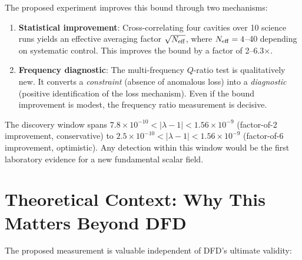 \documentclass[11pt]{article}
\newcommand{\lbone}{|\lambda - 1|}
\newcommand{\ee}[1]{\times 10^{#1}}
\begin{document}
The proposed experiment improves this bound through two mechanisms:
\begin{enumerate}[nosep]
\item \textbf{Statistical improvement}: Cross-correlating four cavities
  over 10 science runs yields an effective averaging factor
  $\sqrt{N_{\rm eff}}$, where $N_{\rm eff} = 4$--40 depending on
  systematic control. This improves the bound by a factor of 2--6.3$\times$.
\item \textbf{Frequency diagnostic}: The multi-frequency $Q$-ratio test
  is qualitatively new. It converts a \textit{constraint} (absence of
  anomalous loss) into a \textit{diagnostic} (positive identification of
  the loss mechanism). Even if the bound improvement is modest, the
  frequency ratio measurement is decisive.
\end{enumerate}

The discovery window spans $7.8\ee{-10} < \lbone < 1.56\ee{-9}$
(factor-of-2 improvement, conservative) to
$2.5\ee{-10} < \lbone < 1.56\ee{-9}$ (factor-of-6 improvement,
optimistic). Any detection within this window would be the first
laboratory evidence for a new fundamental scalar field.


\section{Theoretical Context: Why This Matters Beyond DFD}
\label{sec:broader_context}

The proposed measurement is valuable independent of DFD's ultimate
validity:
\end{document}
